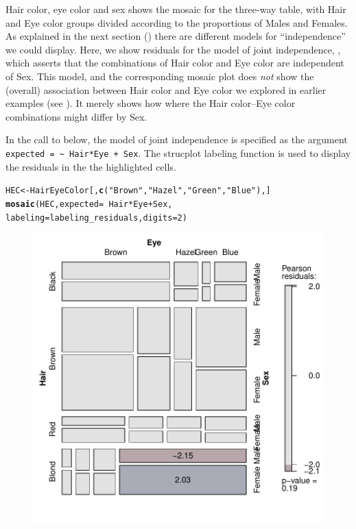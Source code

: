 \documentclass[11pt]{book}\usepackage[]{graphicx}\usepackage[]{color}
\makeatletter
\newcommand{\hlnum}[1]{\textcolor[rgb]{0.686,0.059,0.569}{#1}}%
\newcommand{\hlstr}[1]{\textcolor[rgb]{0.192,0.494,0.8}{#1}}%
\newcommand{\hlopt}[1]{\textcolor[rgb]{0,0,0}{#1}}%
\newcommand{\hlstd}[1]{\textcolor[rgb]{0.345,0.345,0.345}{#1}}%
\newcommand{\hlkwb}[1]{\textcolor[rgb]{0.69,0.353,0.396}{#1}}%
\newcommand{\hlkwc}[1]{\textcolor[rgb]{0.333,0.667,0.333}{#1}}%
\newcommand{\hlkwd}[1]{\textcolor[rgb]{0.737,0.353,0.396}{\textbf{#1}}}%
\newenvironment{kframe}{%
 \def\at@end@of@kframe{}%
 \ifinner\ifhmode%
  \def\at@end@of@kframe{\end{minipage}}%
  \begin{minipage}{\columnwidth}%
 \fi\fi%
 \def\FrameCommand##1{\hskip\@totalleftmargin \hskip-\fboxsep
 \colorbox{shadecolor}{##1}\hskip-\fboxsep
     \hskip-\linewidth \hskip-\@totalleftmargin \hskip\columnwidth}%
 \MakeFramed {\advance\hsize-\width
   \@totalleftmargin\z@ \linewidth\hsize
   \@setminipage}}%
 {\par\unskip\endMakeFramed%
 \at@end@of@kframe}
\newenvironment{knitrout}{}{} %
\renewenvironment{knitrout}{\small\renewcommand{\baselinestretch}{.85}}{} %
\makeatother
\begin{document}
\begin{Example}[HEC1]{Hair color, eye color and sex}
 shows the mosaic for the three-way table, with Hair and Eye color
groups divided according to the proportions of Males and Females.
As explained in the next section ()
there are different models for
``independence'' we could display.  Here, we show residuals for
the model of joint independence, , which 
asserts that the combinations of Hair color and Eye color are
independent of Sex.  This model, and the corresponding mosaic
plot does \emph{not} show the (overall) association between Hair color
and Eye color we explored in earlier examples (see ).  It merely shows how where the Hair color--Eye color
combinations might differ by Sex.

In the call to  below, the model of joint independence
is specified as the argument \verb|expected = ~ Hair*Eye + Sex|.
The strucplot labeling function 
is used to display the residuals in the the highlighted cells.
\begin{knitrout}
\color{fgcolor}\begin{kframe}
\begin{alltt}
\hlstd{HEC} \hlkwb{<-} \hlstd{HairEyeColor[,} \hlkwd{c}\hlstd{(}\hlstr{"Brown"}\hlstd{,} \hlstr{"Hazel"}\hlstd{,} \hlstr{"Green"}\hlstd{,} \hlstr{"Blue"}\hlstd{),]}
\hlkwd{mosaic}\hlstd{(HEC,} \hlkwc{expected} \hlstd{=} \hlopt{~} \hlstd{Hair}\hlopt{*}\hlstd{Eye} \hlopt{+} \hlstd{Sex,}
       \hlkwc{labeling}\hlstd{=labeling_residuals,} \hlkwc{digits}\hlstd{=}\hlnum{2}\hlstd{)}
\end{alltt}
\end{kframe}\begin{figure}[htbp]


\centerline{\includegraphics[width=.7\textwidth]{ch05/fig/HEC-mos1} }


\end{figure}
\end{knitrout}
\end{Example}
\end{document}
